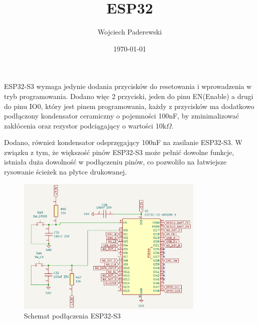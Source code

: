 \documentclass[../../main.tex]{subfiles}
\author{Wojciech Paderewski}
\date{\today}
\title{ESP32}
\begin{document}
ESP32-S3 wymaga jedynie dodania przycisków do resetowania i wprowadzenia w tryb programowania.
Dodano więc 2 przyciski, jeden do pinu EN(Enable) a drugi do pinu IO0, który jest pinem programowania,
każdy z przycisków ma dodatkowo podłączony kondensator ceramiczny o pojemności 100nF, by zminimalizować zakłócenia oraz
rezystor podciągający o wartości 10k$\Omega$.

Dodano, również kondensator odsprzęgający 100nF na zasilanie ESP32-S3. W związku z tym, że większość pinów ESP32-S3 może 
pełnić dowolne funkcje, istniała duża dowolność w podłączeniu pinów, co pozwoliło na łatwiejsze rysowanie ścieżek na płytce drukowanej.

\begin{figure}[H]
    \centering
    \includegraphics[width=0.8\textwidth]{ESP.png}
    \caption{Schemat podłączenia ESP32-S3}
\end{figure}
\end{document}
